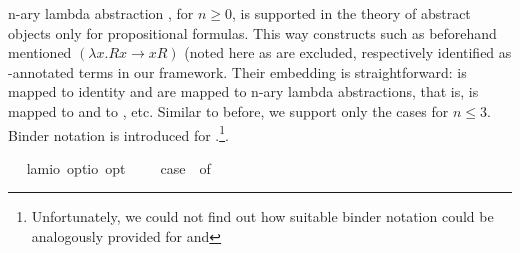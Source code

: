 \begin{isabellebody}
\begin{isamarkuptext}%
n-ary lambda abstraction , for $n\geq 0$, is supported in the theory of abstract 
  objects only for propositional formulas. This way constructs such as 
  beforehand mentioned $(\lambda x. Rx \rightarrow xR)$  (noted here as  
  are excluded, respectively identified as -annotated 
  terms in our framework.
  Their embedding is 
  straightforward:  is mapped to identity and  are mapped to n-ary
  lambda abstractions, that is,  is mapped to  and  
  to , etc.
  Similar to before, we support only the cases for $n\leq 3$. Binder notation is
  introduced for \isa{\isactrlbold {\isasymlambda}}.\footnote{Unfortunately, we could not find out how suitable binder notation
  could be analogously provided for  and }.%
\end{isamarkuptext}%
\isamarkuptrue%
\ \isamarkupfalse%
\ lam{}{\isacharcolon}{\isacharcolon}{\isachardoublequoteopen}io\ opt{\isasymRightarrow}io\ opt{\isachardoublequoteclose}\ {\isacharparenleft}{\isachardoublequoteopen}\isactrlbold {\isasymlambda}\ \ {\isachardoublequoteopen}\isactrlbold {\isasymlambda}\ {\isasymequiv}\ case\ {\isasymphi}\ of\ \isanewline

\end{isabellebody}
